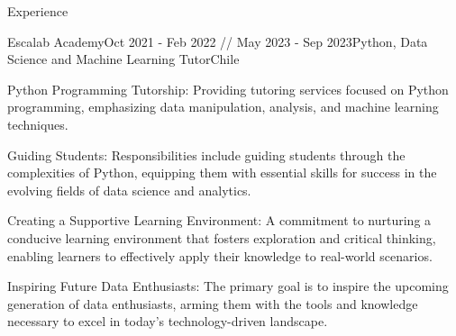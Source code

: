 \documentclass{resume} %
\begin{document}
\begin{rSection}{Experience}
        \begin{rSubsection}{Escalab Academy}{Oct 2021 - Feb 2022 // May 2023 - Sep 2023}{Python, Data Science and Machine Learning Tutor}{Chile}
            {\normalfont 
            \item Python Programming Tutorship: Providing tutoring services focused on Python programming, emphasizing data manipulation, analysis, and machine learning techniques.
            \item Guiding Students: Responsibilities include guiding students through the complexities of Python, equipping them with essential skills for success in the evolving fields of data science and analytics.
            \item Creating a Supportive Learning Environment: A commitment to nurturing a conducive learning environment that fosters exploration and critical thinking, enabling learners to effectively apply their knowledge to real-world scenarios.
            \item Inspiring Future Data Enthusiasts: The primary goal is to inspire the upcoming generation of data enthusiasts, arming them with the tools and knowledge necessary to excel in today's technology-driven landscape.
            }
        \end{rSubsection}



\end{rSection}
\end{document}
